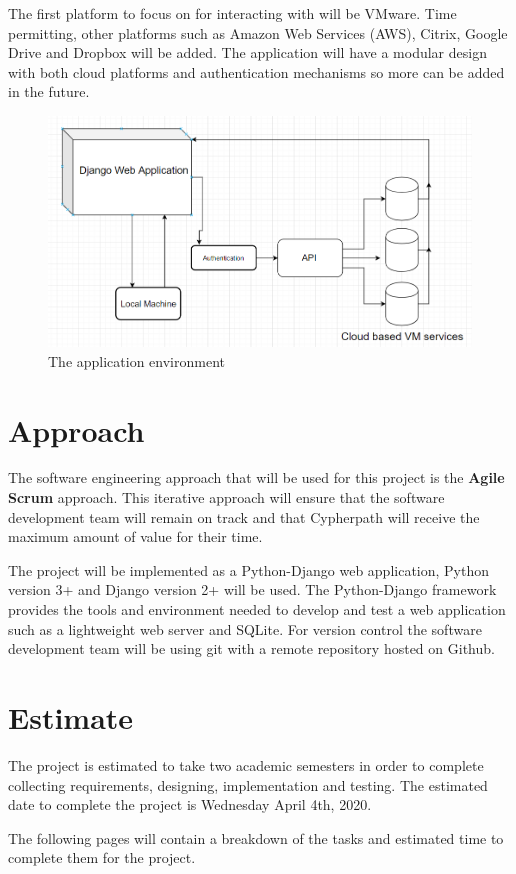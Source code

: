 \documentclass{article}
\begin{document}
    The first platform to focus on for interacting with will be VMware. Time permitting, other platforms such as Amazon Web Services (AWS), Citrix, Google Drive and Dropbox
    will be added. The application will have a modular design with both cloud platforms and authentication mechanisms so more can be added in the future.

    \begin{figure}[h]
    \includegraphics[scale=.7]{diagram}
        \caption{The application environment}
    \end{figure}

    \pagebreak
    \section{Approach}
    The software engineering approach that will be used for this project is the \textbf{Agile Scrum} approach.
    This iterative approach will ensure that the software development team will remain on track and that Cypherpath will receive the maximum amount of value
    for their time.

    The project will be implemented as a Python-Django web application, Python version 3+ and Django version 2+ will be used. The Python-Django framework provides the tools 
    and environment needed to develop and test a web application such as a lightweight web server and SQLite. For version control the software development team will be using git
    with a remote repository hosted on Github.

    \section{Estimate}
    The project is estimated to take two academic semesters in order to complete collecting requirements, designing, implementation and testing. The estimated date
    to complete the project is Wednesday April 4th, 2020.

    The following pages will contain a breakdown of the tasks and estimated time to complete them for the project.

%
\end{document}
